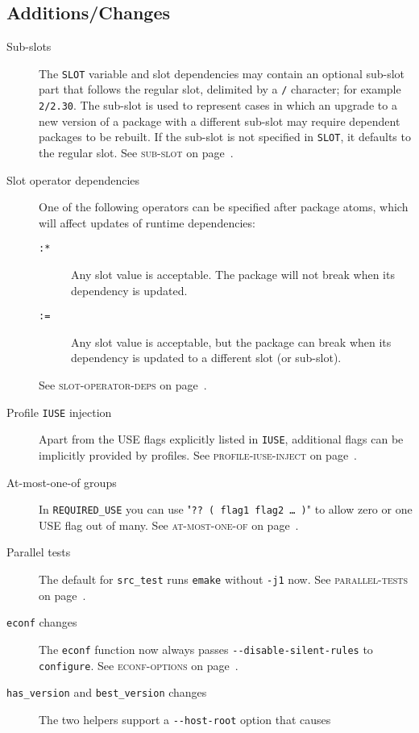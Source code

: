 \documentclass[a4paper]{leaflet}
\newcommand{\code}[1]{\texttt{#1}}
\newcommand{\featureref}[1]{\textsc{#1} on page~\pageref{feat:#1}}
\begin{document}
\subsection{Additions/Changes}
\label{sec:cs:eapi5-additions}
\begin{description}
    \item[Sub-slots] The \code{SLOT} variable and slot dependencies
    may contain an optional sub-slot part that follows the regular
    slot, delimited by a \code{/} character; for example
    \code{2/2.30}.  The sub-slot is used to represent cases in which
    an upgrade to a new version of a package with a different sub-slot
    may require dependent packages to be rebuilt.  If the sub-slot is
    not specified in \code{SLOT}, it defaults to the regular slot.
    See \featureref{sub-slot}.
    \item[Slot operator dependencies] One of the following operators
    can be specified after package atoms, which will affect updates
    of runtime dependencies:
    \begin{description}
        \item[\code{:*}] Any slot value is acceptable.  The package
        will not break when its dependency is updated.
        \item[\code{:=}] Any slot value is acceptable, but the package
        can break when its dependency is updated to a different slot
        (or sub-slot).
    \end{description}
    See \featureref{slot-operator-deps}.
    \item[Profile \code{IUSE} injection] Apart from the USE flags
    explicitly listed in \code{IUSE}, additional flags can be
    implicitly provided by profiles.
    See \featureref{profile-iuse-inject}.
    \item[At-most-one-of groups] In \code{REQUIRED\_USE} you can use
    "\code{?? ( flag1 flag2 \dots\ )}" to allow zero or one USE flag
    out of many.
    See \featureref{at-most-one-of}.
    \item[Parallel tests] The default for \code{src\_test} runs
    \code{emake} without \code{-j1} now.
    See \featureref{parallel-tests}.
    \item[\code{econf} changes] The \code{econf} function now always
    passes \code{-{}-disable-silent-rules} to \code{configure}.
    See \featureref{econf-options}.
    \item[\code{has\_version} and \code{best\_version} changes]
    The two helpers support a \code{-{}-host-root} option that causes

\end{description}
\end{document}
